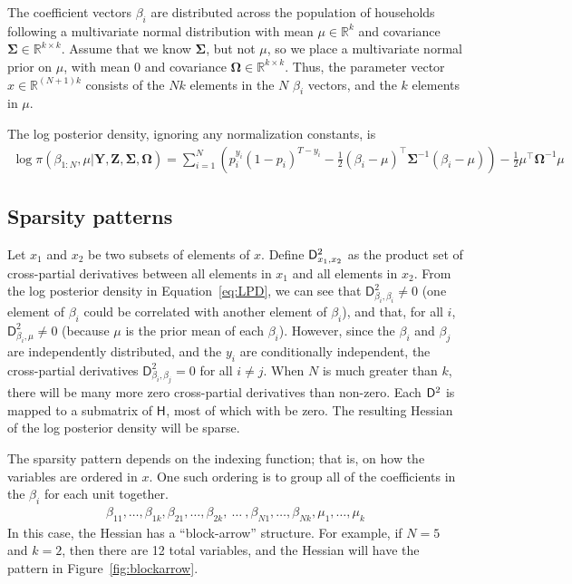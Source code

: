 \documentclass[jss]{jss}\usepackage[]{graphicx}\usepackage[]{color}
\newcommand{\parD}[3]{\mathsf{D}^{#1}_{#2}#3}
\newcommand{\hess}[2]{\mathsf{H}_{#1}#2}
\newcommand{\Mat}[1]{\mathbf{#1}}
\newcommand{\Real}[1]{\mathbb{R}^{#1}}
\begin{document}
The coefficient vectors $\beta_i$ are distributed across the population of households
following a multivariate normal distribution with mean $\mu\in\Real{k}$ and
covariance $\Mat{\Sigma}\in\Real{k\times k}$.   Assume that we know
$\Mat{\Sigma}$, but not $\mu$, so we place a multivariate normal prior
on $\mu$, with mean $0$ and
covariance $\Mat{\Omega}\in\Real{k\times k}$.  Thus, the parameter
vector $x\in\Real{(N+1)k}$ consists of the $Nk$ elements in the $N$ $\beta_i$ vectors,
and the $k$ elements in $\mu$.

The log posterior density, ignoring any normalization constants, is
\begin{align}
  \label{eq:LPD}
  \log \pi(\beta_{1:N},\mu|\Mat{Y}, \Mat{Z}, \Mat{\Sigma},\Mat{\Omega})=\sum_{i=1}^N\left(p_i^{y_i}(1-p_i)^{T-y_i}
  -\frac{1}{2}\left(\beta_i-\mu\right)^\top\Mat{\Sigma}^{-1}\left(\beta_i-\mu\right)\right)
-\frac{1}{2}\mu^\top\Mat{\Omega}^{-1}\mu
\end{align}



\subsection[Sparsity patterns]{Sparsity patterns}\label{sec:sparsity}



Let $x_1$ and $x_2$ be two subsets of elements of $x$.
Define $\parD{2}{x_1,x_2}$ as the product set of cross-partial
derivatives between all elements in $x_1$ and all elements in
$x_2$. From the log posterior density in Equation~\ref{eq:LPD}, we can see
that $\parD{2}{\beta_i, \beta_i}\neq 0$ (one element of $\beta_i$ could be
correlated with another element of $\beta_i$), and that, for all $i$,
$\parD{2}{\beta_i, \mu}\neq 0$ (because $\mu$ is the prior mean of each
$\beta_i$).  However, since the $\beta_i$ and $\beta_j$ are independently distributed, and the $y_i$ are
conditionally independent, the cross-partial derivatives
$\parD{2}{\beta_i, \beta_j}=0$ for all $i\neq j$. When $N$ is much
greater than $k$, there will be many more zero cross-partial
derivatives than non-zero.   Each $\parD{2}{}$ is
mapped to a submatrix of $\hess{}{}$, most of which with be zero.  The
resulting Hessian of the log posterior density will be sparse.

The sparsity pattern depends on the indexing function; that is, on how the variables are
ordered in $x$. One such ordering is to group all of the
coefficients in the $\beta_i$ for each unit together.
\begin{align}
\beta_{11},\dotsc,\beta_{1k},\beta_{21},\dotsc,\beta_{2k},~\dotsc~,\beta_{N1},\dotsc,\beta_{Nk},\mu_1,\dotsc,\mu_k
\end{align}
In this case, the Hessian has a ``block-arrow'' structure.  For example,
if $N=5$ and $k=2$, then there are 12 total
variables, and the Hessian will have the pattern in Figure~\ref{fig:blockarrow}.
\end{document}
